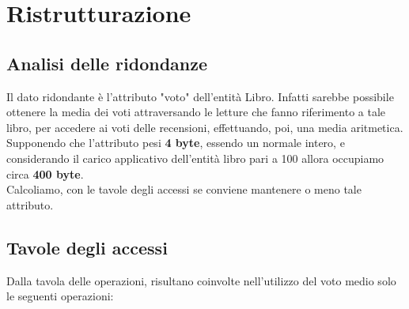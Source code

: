 \documentclass{article}
\begin{document}
\section{Ristrutturazione}
\subsection{Analisi delle ridondanze}
Il dato ridondante è l'attributo "voto" dell'entità Libro.
Infatti sarebbe possibile ottenere la media dei voti attraversando le letture che fanno riferimento a tale libro, per accedere ai voti delle
recensioni, effettuando, poi, una media aritmetica. \\
Supponendo che l'attributo pesi \textbf{4 byte}, essendo un normale intero, e considerando il carico applicativo
dell'entità libro pari a 100 allora occupiamo circa \textbf{400 byte}.\\
Calcoliamo, con le tavole degli accessi se conviene mantenere o meno tale attributo.

\subsection{Tavole degli accessi}

Dalla tavola delle operazioni, risultano coinvolte nell'utilizzo del voto medio
solo le seguenti operazioni:
\end{document}
